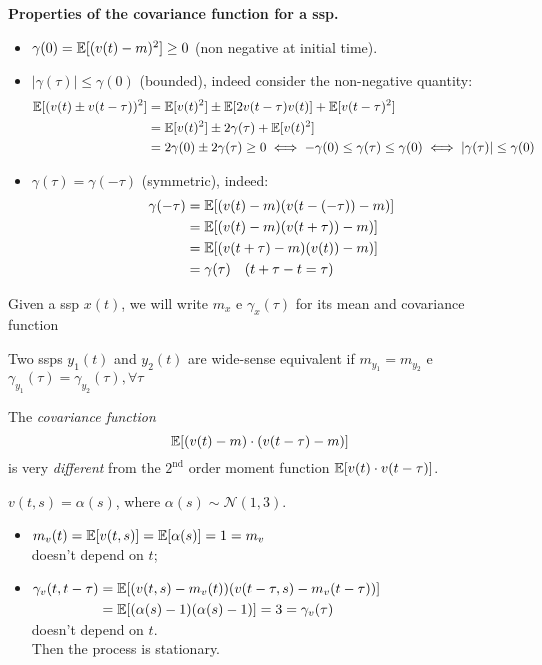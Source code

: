 \textbf{Properties of the covariance function for a \gls{ssp}.}
\begin{itemize}
	\item $\gamma(0)=\mathbb{E}[(v(t)-m)^{2}] \geq 0$ (non negative at initial time).
	\item $|\gamma(\tau)| \leq \gamma(0)$ (bounded), indeed consider the non-negative quantity:
	\begin{align*}
		\mathbb{E}[(v(t) \pm v(t-\tau))^2] &= \mathbb{E}[v(t)^2] \pm \mathbb{E}[2v(t-\tau)v(t)]+\mathbb{E}[v(t-\tau)^2]\\
		&=\mathbb{E}[v(t)^2] \pm 2\gamma(\tau)+\mathbb{E}[v(t)^2]\\
		&=2\gamma(0) \pm 2\gamma(\tau) \geq 0 
		\iff -\gamma(0) \leq \gamma(\tau) \leq \gamma(0) \iff |\gamma(\tau)| \leq \gamma(0)
	\end{align*}
	\item $\gamma(\tau)=\gamma(-\tau)$ (symmetric), indeed:
	\begin{align*}
		\gamma(-\tau)&=\mathbb{E}[(v(t)-m)(v(t-(-\tau))-m)]\\
		&=\mathbb{E}[(v(t)-m)(v(t+\tau))-m)]\\
		&=\mathbb{E}[(v(t+\tau)-m)(v(t))-m)]\\
		&=\gamma(\tau) \quad(t+\tau-t=\tau)
	\end{align*}
\end{itemize}


Given a \gls{ssp} $x(t)$, we will write $m_{x}$ e $\gamma_{x}(\tau)$ for its mean and covariance function

Two \glspl{ssp} $y_{1}(t)$ and $y_{2}(t)$ are wide-sense equivalent if $m_{y_{1}}=m_{y_{2}}$ e $\gamma_{y_{1}}(\tau)=\gamma_{y_{2}}(\tau), \forall \tau$

The \emph{covariance function}
$$
	\mathbb{E}[(v(t)-m) \cdot(v(t-\tau)-m)]
$$
is very \emph{different} from the $2^{\text{nd}}$ order moment function $\mathbb{E}[v(t) \cdot v(t-\tau)]$.

\begin{example}
$\boxed{v(t,s)=\alpha (s)}$, where $\alpha (s)\sim \mathcal{N}(1,3)$.

\begin{itemize}
	\item $m_{v}(t)=\mathbb{E}[v(t, s)]=\mathbb{E}[\alpha(s)]=1=m_{v}$\\
	doesn't depend on $t$;
	\item $\begin{aligned}[t]
		\gamma_{v}(t, t-\tau)&=\mathbb{E}[(v(t, s)-m_{v}(t))(v(t-\tau, s)-m_{v}(t-\tau))]\\
		&=\mathbb{E}[(\alpha(s)-1)(\alpha(s)-1)]=3=\gamma_{v}(\tau)
	\end{aligned}$\\
	doesn't depend on $t$.\\
	Then the process is stationary.
\end{itemize}
\end{example}


